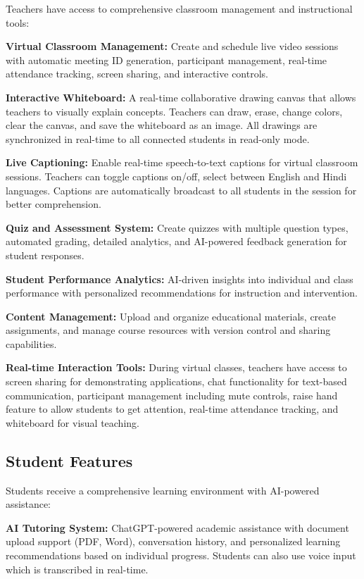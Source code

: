 \documentclass[onecolumn]{IEEEtran}
\begin{document}
Teachers have access to comprehensive classroom management and instructional tools:

\textbf{Virtual Classroom Management:} Create and schedule live video sessions with automatic meeting ID generation, participant management, real-time attendance tracking, screen sharing, and interactive controls.

\textbf{Interactive Whiteboard:} A real-time collaborative drawing canvas that allows teachers to visually explain concepts. Teachers can draw, erase, change colors, clear the canvas, and save the whiteboard as an image. All drawings are synchronized in real-time to all connected students in read-only mode.

\textbf{Live Captioning:} Enable real-time speech-to-text captions for virtual classroom sessions. Teachers can toggle captions on/off, select between English and Hindi languages. Captions are automatically broadcast to all students in the session for better comprehension.

\textbf{Quiz and Assessment System:} Create quizzes with multiple question types, automated grading, detailed analytics, and AI-powered feedback generation for student responses.

\textbf{Student Performance Analytics:} AI-driven insights into individual and class performance with personalized recommendations for instruction and intervention.

\textbf{Content Management:} Upload and organize educational materials, create assignments, and manage course resources with version control and sharing capabilities.

\textbf{Real-time Interaction Tools:} During virtual classes, teachers have access to screen sharing for demonstrating applications, chat functionality for text-based communication, participant management including mute controls, raise hand feature to allow students to get attention, real-time attendance tracking, and whiteboard for visual teaching.

\subsection{Student Features}

Students receive a comprehensive learning environment with AI-powered assistance:

\textbf{AI Tutoring System:} ChatGPT-powered academic assistance with document upload support (PDF, Word), conversation history, and personalized learning recommendations based on individual progress. Students can also use voice input which is transcribed in real-time.
\end{document}
